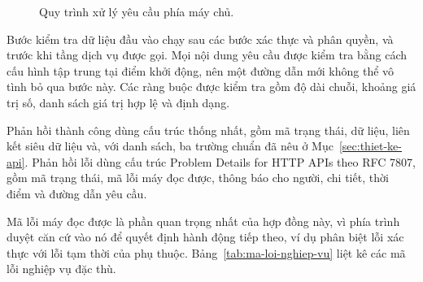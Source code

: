 \begin{figure}[htbp]
{%
    }
    \caption{Quy trình xử lý yêu cầu phía máy chủ.}
    \label{fig:quy-trinh-request}
\end{figure}

Bước kiểm tra dữ liệu đầu vào chạy sau các bước xác thực và phân quyền, và trước khi tầng dịch vụ được gọi. Mọi nội dung yêu cầu được kiểm tra bằng cách cấu hình tập trung tại điểm khởi động, nên một đường dẫn mới không thể vô tình bỏ qua bước này. Các ràng buộc được kiểm tra gồm độ dài chuỗi, khoảng giá trị số, danh sách giá trị hợp lệ và định dạng.

Phản hồi thành công dùng cấu trúc thống nhất, gồm mã trạng thái, dữ liệu, liên kết siêu dữ liệu và, với danh sách, ba trường chuẩn đã nêu ở Mục~\ref{sec:thiet-ke-api}. Phản hồi lỗi dùng cấu trúc Problem Details for HTTP APIs theo RFC 7807, gồm mã trạng thái, mã lỗi máy đọc được, thông báo cho người, chi tiết, thời điểm và đường dẫn yêu cầu.

Mã lỗi máy đọc được là phần quan trọng nhất của hợp đồng này, vì phía trình duyệt căn cứ vào nó để quyết định hành động tiếp theo, ví dụ phân biệt lỗi xác thực với lỗi tạm thời của phụ thuộc. Bảng~\ref{tab:ma-loi-nghiep-vu} liệt kê các mã lỗi nghiệp vụ đặc thù.

